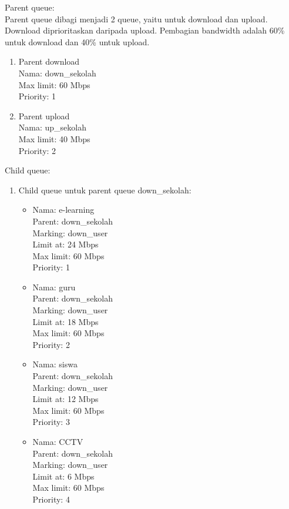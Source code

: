 \begin{enumerate}
	Parent queue:\\
	Parent queue dibagi menjadi 2 queue, yaitu untuk download dan upload. Download diprioritaskan daripada upload. Pembagian bandwidth adalah 60\% untuk download dan 40\% untuk upload.
	\begin{enumerate}
		\item Parent download\\
		Nama: down\_sekolah\\
		Max limit: 60 Mbps\\
		Priority: 1
		\item Parent upload\\
		Nama: up\_sekolah\\
		Max limit: 40 Mbps\\
		Priority: 2
	\end{enumerate}

	Child queue:
	\begin{enumerate}
		\item Child queue untuk parent queue down\_sekolah:
		\begin{itemize}
			\item Nama: e-learning\\
			Parent: down\_sekolah\\
			Marking: down\_user\\
			Limit at: 24 Mbps\\
			Max limit: 60 Mbps\\
			Priority: 1
			
			\item Nama: guru\\
			Parent: down\_sekolah\\
			Marking: down\_user\\
			Limit at: 18 Mbps\\
			Max limit: 60 Mbps\\
			Priority: 2
			
			\item Nama: siswa\\
			Parent: down\_sekolah\\
			Marking: down\_user\\
			Limit at: 12 Mbps\\
			Max limit: 60 Mbps\\
			Priority: 3
			
			\item Nama: CCTV\\
			Parent: down\_sekolah\\
			Marking: down\_user\\
			Limit at: 6 Mbps\\
			Max limit: 60 Mbps\\
			Priority: 4
		\end{itemize}
		

\end{enumerate}
\end{enumerate}
